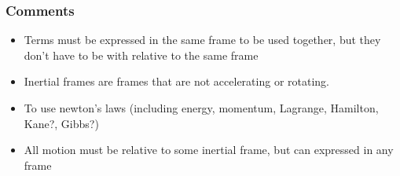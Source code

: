 \documentclass[a4paper]{article}
\begin{document}
\subsubsection*{Comments}

\begin{itemize}
    \item Terms must be expressed in the same frame to be used together, but they don't have to be with relative to the same frame
    \item Inertial frames are frames that are not accelerating or rotating.
    \item To use newton's laws (including energy, momentum, Lagrange, Hamilton, Kane?, Gibbs?)
    \item All motion must be relative to some inertial frame, but can expressed in any frame
\end{itemize}
\end{document}
